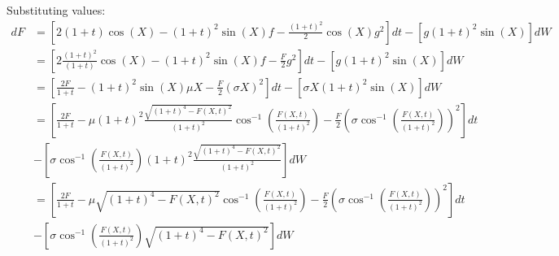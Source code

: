 \documentclass[fleqn]{article}
\begin{document}
    Substituting values:
    \begin{equation*}
        \begin{aligned}
        dF &= \left[ 2(1+t) \cos(X) -(1+t)^2 \sin(X) f - \frac{(1+t)^2}{2} \cos(X) g^2 \right]dt - \left[g(1+t)^2 \sin(X)\right] dW \\
               &= \left[ 2 \frac{(1+t)^2}{(1+t)} \cos(X) - (1+t)^2 \sin(X) f - \frac{F}{2} g^2 \right]dt - \left[g(1+t)^2 \sin(X) \right] dW \\
            &= \left[ \frac{2F}{1+t} - (1+t)^2 \sin(X) \mu X - \frac{F}{2} (\sigma X)^2 \right]dt - \left[\sigma X (1+t)^2 \sin(X) \right] dW \\
            &= \left[ \frac{2F}{1+t} - \mu (1+t)^2 \frac{\sqrt{(1+t)^4 - F(X,t)^2} }{(1+t)^2} \cos^{-1} \left(\frac{F(X,t)}{(1+t)^2}\right) - \frac{F}{2} \left(\sigma \cos^{-1}\left( \frac{F(X,t)}{(1+t)^2} \right)\right)^2 \right]dt\\
            &- \left[\sigma \cos^{-1}\left(\frac{F(X,t)}{(1+t)^2}\right) (1+t)^2 \frac{\sqrt{(1+t)^4 - F(X,t)^2}}{(1+t)^2} \right] dW \\
            &= \left[ \frac{2F}{1+t} - \mu \sqrt{(1+t)^4 - F(X,t)^2} \cos^{-1} \left(\frac{F(X,t)}{(1+t)^2}\right) - \frac{F}{2} \left(\sigma \cos^{-1}\left( \frac{F(X,t)}{(1+t)^2} \right)\right)^2 \right]dt \\
            &- \left[\sigma \cos^{-1}\left(\frac{F(X,t)}{(1+t)^2}\right) \sqrt{(1+t)^4 - F(X,t)^2} \right] dW \\
        \end{aligned}
    \end{equation*}
    \clearpage
\end{document}
